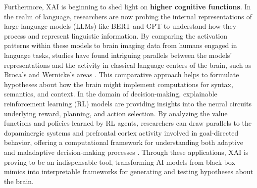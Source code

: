 Furthermore, XAI is beginning to shed light on \textbf{higher cognitive functions}. In the realm of language, researchers are now probing the internal representations of large language models (LLMs) like BERT and GPT to understand how they process and represent linguistic information. By comparing the activation patterns within these models to brain imaging data from humans engaged in language tasks, studies have found intriguing parallels between the models' representations and the activity in classical language centers of the brain, such as Broca's and Wernicke's areas \cite{caucheteux2022brains, toneva2019interpreting}. This comparative approach helps to formulate hypotheses about how the brain might implement computations for syntax, semantics, and context. In the domain of decision-making, explainable reinforcement learning (RL) models are providing insights into the neural circuits underlying reward, planning, and action selection. By analyzing the value functions and policies learned by RL agents, researchers can draw parallels to the dopaminergic systems and prefrontal cortex activity involved in goal-directed behavior, offering a computational framework for understanding both adaptive and maladaptive decision-making processes \cite{richards2019deep}. Through these applications, XAI is proving to be an indispensable tool, transforming AI models from black-box mimics into interpretable frameworks for generating and testing hypotheses about the brain.

\clearpage